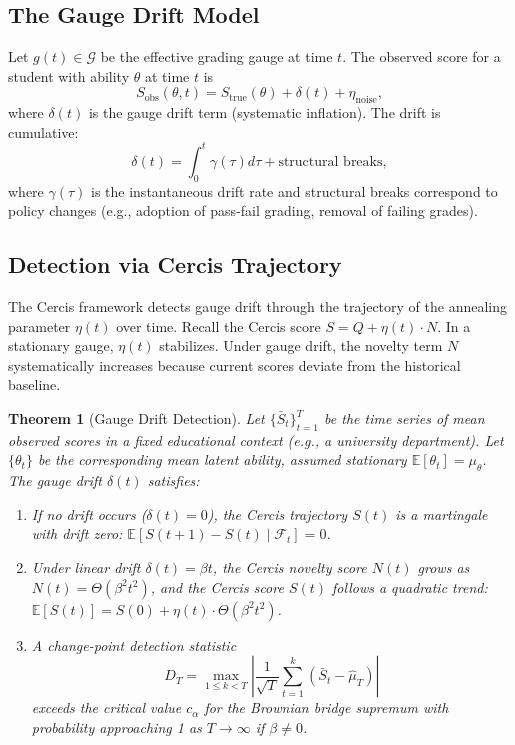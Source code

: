 \documentclass[12pt,a4paper]{article}
\newtheorem{theorem}{Theorem}[section]
\theoremstyle{remark}
\newcommand{\G}{\mathcal{G}}
\begin{document}
\subsection{The Gauge Drift Model}

Let $g(t) \in \G$ be the effective grading gauge at time $t$. The observed score for a student with ability $\theta$ at time $t$ is
\begin{equation}
S_{\text{obs}}(\theta, t) = S_{\text{true}}(\theta) + \delta(t) + \eta_{\text{noise}},
\label{eq:drift_obs}
\end{equation}
where $\delta(t)$ is the gauge drift term (systematic inflation). The drift is cumulative:
\begin{equation}
\delta(t) = \int_0^t \gamma(\tau) d\tau + \text{structural breaks},
\label{eq:drift_accum}
\end{equation}
where $\gamma(\tau)$ is the instantaneous drift rate and structural breaks correspond to policy changes (e.g., adoption of pass-fail grading, removal of failing grades).

\subsection{Detection via Cercis Trajectory}

The Cercis framework detects gauge drift through the trajectory of the annealing parameter $\eta(t)$ over time. Recall the Cercis score $S = Q + \eta(t) \cdot N$. In a stationary gauge, $\eta(t)$ stabilizes. Under gauge drift, the novelty term $N$ systematically increases because current scores deviate from the historical baseline.

\begin{theorem}[Gauge Drift Detection]
\label{thm:drift}
Let $\{\bar{S}_t\}_{t=1}^T$ be the time series of mean observed scores in a fixed educational context (e.g., a university department). Let $\{\theta_t\}$ be the corresponding mean latent ability, assumed stationary $\mathbb{E}[\theta_t] = \mu_\theta$. The gauge drift $\delta(t)$ satisfies:
\begin{enumerate}
    \item If no drift occurs ($\delta(t) = 0$), the Cercis trajectory $S(t)$ is a martingale with drift zero: $\mathbb{E}[S(t+1) - S(t) \mid \mathcal{F}_t] = 0$.
    \item Under linear drift $\delta(t) = \beta t$, the Cercis novelty score $N(t)$ grows as $N(t) = \Theta(\beta^2 t^2)$, and the Cercis score $S(t)$ follows a quadratic trend: $\mathbb{E}[S(t)] = S(0) + \eta(t) \cdot \Theta(\beta^2 t^2)$.
    \item A change-point detection statistic \cite{hinkley1970}
    \begin{equation}
    D_T = \max_{1 \leq k < T} \left| \frac{1}{\sqrt{T}} \sum_{t=1}^k (\bar{S}_t - \hat{\mu}_T) \right|
    \label{eq:changepoint}
    \end{equation}
    exceeds the critical value $c_\alpha$ for the Brownian bridge supremum with probability approaching 1 as $T \to \infty$ if $\beta \neq 0$.
\end{enumerate}
\end{theorem}
\end{document}
